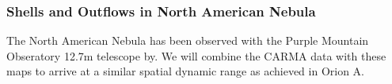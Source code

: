 \subsubsection{Shells and Outflows in North American Nebula}\label{sec:paper3}
        The North American Nebula has been observed with the Purple Mountain Obseratory 12.7m telescope by. We will combine the CARMA data with these maps to arrive at a similar spatial dynamic range as achieved in Orion A.


    